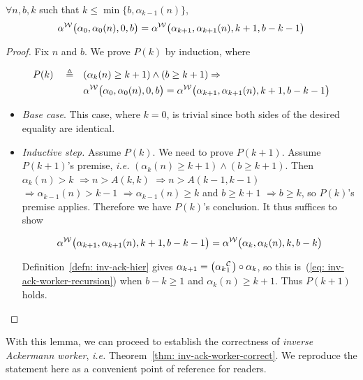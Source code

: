 \begin{lem} \label{lem: inv-ack-worker-intermediate}
	$\forall n, b, k$ such that $k\le \min\big\{b, \alpha_{k-1}(n)\big\}$,
	\begin{equation*}
	\alpha^{\mathcal{W}}\big(\alpha_0, \alpha_0(n), 0, b\big) = \alpha^{\mathcal{W}}\big(\alpha_{k+1}, \alpha_{k+1}(n), k+1, b-k-1\big)
	\end{equation*}
\end{lem}

\begin{proof}
	Fix $n$ and $b$. We prove $P(k)$ by induction, where
	
	\begin{equation*}
	\begin{aligned}
	P(k) \quad \triangleq \quad & (\alpha_k(n)\ge k+1) \wedge (b\ge k+1) \implies \null \\ & \alpha^{\W}\big(\alpha_0, \alpha_0(n), 0, b\big) = \alpha^{\W}\big(\alpha_{k+1}, \alpha_{k+1}(n), k+1, b-k-1\big)
	\end{aligned}
	\end{equation*}
	
	\begin{itemize}[leftmargin=*]
		\item \emph{Base case}. This case, where $k = 0$, is trivial since both sides of the desired equality are identical.
		
		\item \emph{Inductive step.} Assume $P(k)$. We need to prove $P(k+1)$. Assume $P(k+1)$'s premise, \emph{i.e.} $(\alpha_k(n)\ge k+1) \wedge (b\ge k+1)$. Then $\alpha_k(n) > k$ $\Rightarrow n > A(k, k)$ $\Rightarrow n > A(k-1, k-1)$ $\Rightarrow \alpha_{k-1}(n) > k - 1$ $\Rightarrow \alpha_{k-1}(n)\ge k$ and $b\ge k+1$ $\Rightarrow b\ge k$, so $P(k)$'s premise applies. Therefore we have $P(k)$'s conclusion. It thus suffices to show
		
		\begin{equation*}
		\alpha^{\mathcal{W}}\big(\alpha_{k+1}, \alpha_{k+1}(n), k+1, b-k-1\big)
		= \alpha^{\mathcal{W}}\big(\alpha_k, \alpha_k(n), k, b-k\big)
		\end{equation*}
		
		Definition~\ref{defn: inv-ack-hier} gives $\alpha_{k+1} = \big(\cdt{\alpha_k}{1}\big)\circ \alpha_k$, so this
		is~(\ref{eq: inv-ack-worker-recursion}) when $b - k\ge 1$ and $\alpha_k(n)\ge k+1$. Thus $P(k+1)$ holds.
	\end{itemize}
\end{proof}
With this lemma, we can proceed to establish the correctness of \emph{inverse Ackermann worker}, \emph{i.e.} Theorem~\ref{thm: inv-ack-worker-correct}. We reproduce the statement here as a convenient point of reference for readers.

